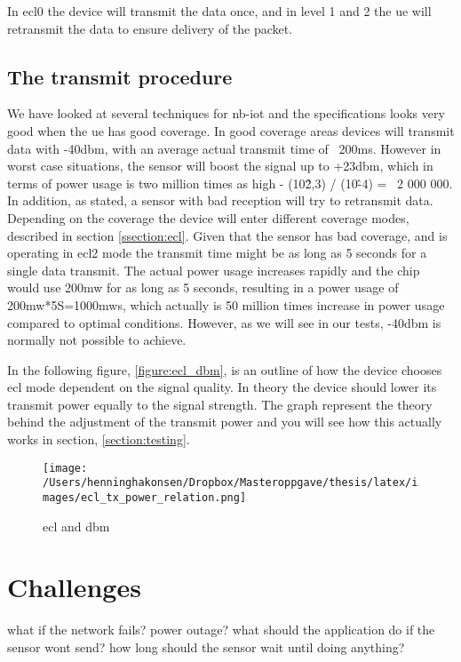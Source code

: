 \documentclass[USenglish]{ifimaster}  %
\begin{document}
In \acrshort{ecl}0 the device will transmit the data once, and in level 1 and 2 the \acrshort{ue} will retransmit the data to ensure delivery of the packet.

\subsection{The transmit procedure}
We have looked at several techniques for \acrshort{nb-iot} and the specifications looks very good when the \acrshort{ue} has good coverage. In good coverage areas devices will transmit data with -40\acrshort{dbm}, with an average actual transmit time of ~200ms. However in worst case situations, the sensor will boost the signal up to +23\acrshort{dbm}, which in terms of power usage is two million times as high - (10\^2,3) / (10\^-4) = ~2 000 000. In addition, as stated, a sensor with bad reception will try to retransmit data. Depending on the coverage the device will enter different coverage modes, described in section \vref{ssection:ecl}. Given that the sensor has bad coverage, and is operating in \acrshort{ecl}2 mode the transmit time might be as long as 5 seconds for a single data transmit. The actual power usage increases rapidly and the chip would use 200\acrshort{mw} for as long as 5 seconds, resulting in a power usage of 200\acrshort{mw}*5S=1000\acrshort{mws}, which actually is 50 million times increase in power usage compared to optimal conditions. However, as we will see in our tests, -40\acrshort{dbm} is normally not possible to achieve.

In the following figure, \vref{figure:ecl_dbm}, is an outline of how the device chooses \acrshort{ecl} mode dependent on the signal quality. In theory the device should lower its transmit power equally to the signal strength. The graph represent the theory behind the adjustment of the transmit power and you will see how this actually works in section, \vref{section:testing}.


\begin{figure}[ht]
  \centering\texttt{[image: /Users/henninghakonsen/Dropbox/Masteroppgave/thesis/latex/images/ecl\_tx\_power\_relation.png]}
  \caption{\acrshort{ecl} and \acrshort{dbm}}
  \label{figure:ecl_dbm}
\end{figure}

\section{Challenges}
what if the network fails?
power outage?
what should the application do if the sensor wont send?
how long should the sensor wait until doing anything?
\end{document}
